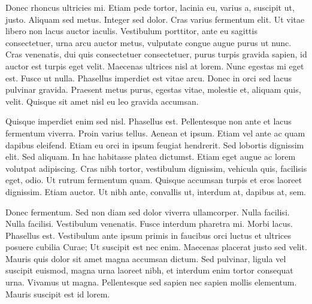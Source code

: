 \documentclass[12pt]{book}
\begin{document}





\noindent
Donec rhoncus ultricies mi. Etiam pede tortor, lacinia eu, varius a, suscipit ut, justo. Aliquam sed metus. Integer sed dolor. Cras varius fermentum elit. Ut vitae libero non lacus auctor iaculis. Vestibulum porttitor, ante eu sagittis consectetuer, urna arcu auctor metus, vulputate congue augue purus ut nunc. Cras venenatis, dui quis consectetuer consectetuer, purus turpis gravida sapien, id auctor est turpis eget velit. Maecenas ultrices nisl at lorem. Nunc egestas mi eget est. Fusce ut nulla. Phasellus imperdiet est vitae arcu. Donec in orci sed lacus pulvinar gravida. Praesent metus purus, egestas vitae, molestie et, aliquam quis, velit. Quisque sit amet nisl eu leo gravida accumsan.

Quisque imperdiet enim sed nisl. Phasellus est. Pellentesque non ante et lacus fermentum viverra. Proin varius tellus. Aenean et ipsum. Etiam vel ante ac quam dapibus eleifend. Etiam eu orci in ipsum feugiat hendrerit. Sed lobortis dignissim elit. Sed aliquam. In hac habitasse platea dictumst. Etiam eget augue ac lorem volutpat adipiscing. Cras nibh tortor, vestibulum dignissim, vehicula quis, facilisis eget, odio. Ut rutrum fermentum quam. Quisque accumsan turpis et eros laoreet dignissim. Etiam auctor. Ut nibh ante, convallis ut, interdum at, dapibus at, sem.

Donec fermentum. Sed non diam sed dolor viverra ullamcorper. Nulla facilisi. Nulla facilisi. Vestibulum venenatis. Fusce interdum pharetra mi. Morbi lacus. Phasellus est. Vestibulum ante ipsum primis in faucibus orci luctus et ultrices posuere cubilia Curae; Ut suscipit est nec enim. Maecenas placerat justo sed velit. Mauris quis dolor sit amet magna accumsan dictum. Sed pulvinar, ligula vel suscipit euismod, magna urna laoreet nibh, et interdum enim tortor consequat urna. Vivamus ut magna. Pellentesque sed sapien nec sapien mollis elementum. Mauris suscipit est id lorem.
\end{document}
